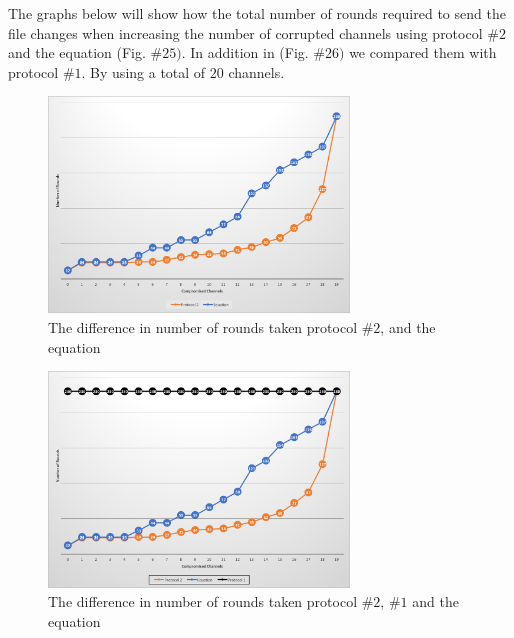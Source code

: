 \documentclass[main.tex]{subfiles}
\begin{document}
 The graphs below will show how the total number of rounds required to send the file changes when increasing the number of corrupted channels using protocol $\#2$ and the equation (Fig. $\#25)$. In addition in (Fig. $\#26)$ we compared them with protocol $\#1$. By using a total of $20$ channels.\\
\begin{figure}[!htb]
\centering
\includegraphics[keepaspectratio, width=8cm]{pics/20Pro2Eq.png}
\caption{The difference in number of rounds taken protocol $\#2$, and the equation}
\end{figure}
\begin{figure}[!htb]
\includegraphics[keepaspectratio, width=8cm]{pics/20Complete.png}
\caption{The difference in number of rounds taken protocol $\#2$, $\#1$ and the equation}
\end{figure}
\end{document}
